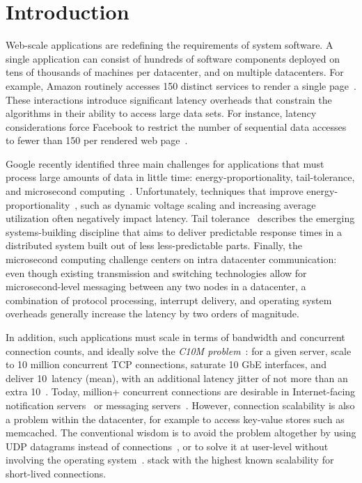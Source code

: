 
\section{Introduction}
\label{sec:intro}


Web-scale applications are redefining the requirements of system
software.  A single application can consist of hundreds of software
components deployed on tens of thousands of machines per datacenter,
and on multiple datacenters.  For example, Amazon routinely accesses
150 distinct services to render a single
page~\cite{DBLP:conf/sosp/DeCandiaHJKLPSVV07}.  These interactions
introduce significant latency overheads that constrain the algorithms
in their ability to access large data sets.  For instance, latency
considerations force Facebook to restrict the number of sequential
data accesses to fewer than 150 per rendered web page~\cite{rumble2011s}.

Google recently identified three main challenges for applications that
must process large amounts of data in little time:
energy-proportionality, tail-tolerance, and microsecond
computing~\cite{luiz-isscc}.  Unfortunately, techniques that improve
energy-proportionality~\cite{DBLP:journals/computer/BarrosoH07}, such
as dynamic voltage scaling and increasing average utilization often
negatively impact latency.  Tail
tolerance~\cite{DBLP:journals/cacm/DeanB13} describes the emerging
systems-building discipline that aims to deliver predictable response
times in a distributed system built out of less less-predictable
parts.  Finally, the microsecond computing challenge centers on intra
datacenter communication: even though existing transmission and
switching technologies allow for microsecond-level messaging between
any two nodes in a datacenter, a combination of protocol processing,
interrupt delivery, and operating system overheads generally increase
the latency by two orders of magnitude.

In addition, such applications must scale in terms of bandwidth and
concurrent connection counts, and ideally solve the \emph{C10M
  problem}~\cite{theC10Mproblem}: for a given server, scale to 10
million concurrent TCP connections, saturate 10 GbE interfaces, and
deliver 10~\microsecond latency (mean), with an additional latency
jitter of not more than an extra 10~\microsecond.  Today, million+
concurrent connections are desirable in Internet-facing notification
servers~\cite{DBLP:conf/sosp/AdyaCMP11} or messaging
servers~\cite{whatsapp-2mil}.  However, connection scalability is also
a problem within the datacenter, for example to access key-value
stores such as memcached.  The conventional wisdom is to avoid the
problem altogether by using UDP datagrams instead of
connections~\cite{nishtala2013scaling}, or to solve it at user-level
without involving the operating system~\cite{jeong2014mtcp}.  stack
with the highest known scalability for short-lived connections.


